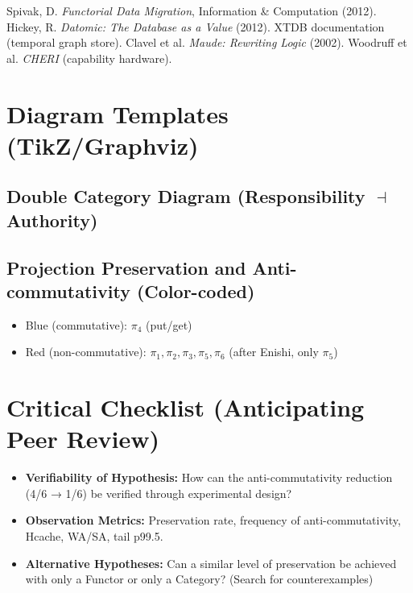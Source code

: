 \documentclass[10pt]{article}
\begin{document}

\begin{thebibliography}{9}
 Spivak, D. \emph{Functorial Data Migration}, Information \& Computation (2012).
 Hickey, R. \emph{Datomic: The Database as a Value} (2012).
 XTDB documentation (temporal graph store).
 Clavel et al. \emph{Maude: Rewriting Logic} (2002).
 Woodruff et al. \emph{CHERI} (capability hardware).
\end{thebibliography}

\appendix
\section{Diagram Templates (TikZ/Graphviz)}

\subsection{Double Category Diagram (Responsibility $\dashv$ Authority)}


\subsection{Projection Preservation and Anti-commutativity (Color-coded)}
\begin{itemize}
    \item Blue (commutative): $\pi_4$ (put/get)
    \item Red (non-commutative): $\pi_1,\pi_2,\pi_3,\pi_5,\pi_6$ (after Enishi, only $\pi_5$)
\end{itemize}

\section{Critical Checklist (Anticipating Peer Review)}
\begin{itemize}
    \item \textbf{Verifiability of Hypothesis:} How can the anti-commutativity reduction (4/6 → 1/6) be verified through experimental design?
    \item \textbf{Observation Metrics:} Preservation rate, frequency of anti-commutativity, Hcache, WA/SA, tail p99.5.
    \item \textbf{Alternative Hypotheses:} Can a similar level of preservation be achieved with only a Functor or only a Category? (Search for counterexamples)
\end{itemize}
\end{document}
